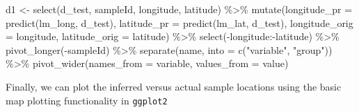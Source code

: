 \documentclass[
]{article}
\newenvironment{Shaded}{\begin{snugshade}}{\end{snugshade}}
\newcommand{\AttributeTok}[1]{\textcolor[rgb]{0.77,0.63,0.00}{#1}}
\newcommand{\FunctionTok}[1]{\textcolor[rgb]{0.00,0.00,0.00}{#1}}
\newcommand{\NormalTok}[1]{#1}
\newcommand{\OtherTok}[1]{\textcolor[rgb]{0.56,0.35,0.01}{#1}}
\newcommand{\SpecialCharTok}[1]{\textcolor[rgb]{0.00,0.00,0.00}{#1}}
\newcommand{\StringTok}[1]{\textcolor[rgb]{0.31,0.60,0.02}{#1}}
\begin{document}
\begin{Shaded}
\begin{Highlighting}[]
\NormalTok{d1 }\OtherTok{\textless{}{-}} \FunctionTok{select}\NormalTok{(d\_test, sampleId, longitude, latitude) }\SpecialCharTok{\%\textgreater{}\%}
    \FunctionTok{mutate}\NormalTok{(}\AttributeTok{longitude\_pr =} \FunctionTok{predict}\NormalTok{(lm\_long, d\_test), }\AttributeTok{latitude\_pr =} \FunctionTok{predict}\NormalTok{(lm\_lat, d\_test), }\AttributeTok{longitude\_orig =}\NormalTok{ longitude, }\AttributeTok{latitude\_orig =}\NormalTok{ latitude) }\SpecialCharTok{\%\textgreater{}\%}
    \FunctionTok{select}\NormalTok{(}\SpecialCharTok{{-}}\NormalTok{longitude}\SpecialCharTok{:{-}}\NormalTok{latitude) }\SpecialCharTok{\%\textgreater{}\%}
    \FunctionTok{pivot\_longer}\NormalTok{(}\SpecialCharTok{{-}}\NormalTok{sampleId) }\SpecialCharTok{\%\textgreater{}\%}
    \FunctionTok{separate}\NormalTok{(name, }\AttributeTok{into =} \FunctionTok{c}\NormalTok{(}\StringTok{"variable"}\NormalTok{, }\StringTok{"group"}\NormalTok{)) }\SpecialCharTok{\%\textgreater{}\%}
    \FunctionTok{pivot\_wider}\NormalTok{(}\AttributeTok{names\_from =}\NormalTok{ variable, }\AttributeTok{values\_from =}\NormalTok{ value)}
\end{Highlighting}
\end{Shaded}

Finally, we can plot the inferred versus actual sample locations using
the basic map plotting functionality in \texttt{ggplot2}
\end{document}
